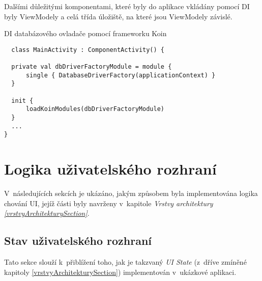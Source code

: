 Dalšími důležitými komponentami, které byly do aplikace vkládány pomocí DI byly ViewModely a celá třída úložiště, na které jsou ViewModely
závislé.

\begin{listing}[H]
\caption{DI databázového ovladače pomocí frameworku Koin}\label{lst:KoinInit}
\begin{verbatim}
  class MainActivity : ComponentActivity() {

  private val dbDriverFactoryModule = module {
      single { DatabaseDriverFactory(applicationContext) }
  }

  init {
      loadKoinModules(dbDriverFactoryModule)
  }
  ...
}
\end{verbatim}
\end{listing}





\section{Logika uživatelského rozhraní} \label{UILayerImpl}
V~následujících sekcích je ukázáno, jakým způsobem byla implementována logika chování UI, jejíž části byly navrženy v~kapitole 
\textit{Vrstvy architektury \ref{vrstvyArchitekturySection}}. 



\subsection{Stav uživatelského rozhraní} \label{stateHandlingImpl}
Tato sekce slouží k~přiblížení toho, jak je takzvaný \textit{UI State} (z~dříve zmíněné kapitoly \ref{vrstvyArchitekturySection}) 
implementován v~ukázkové aplikaci.

